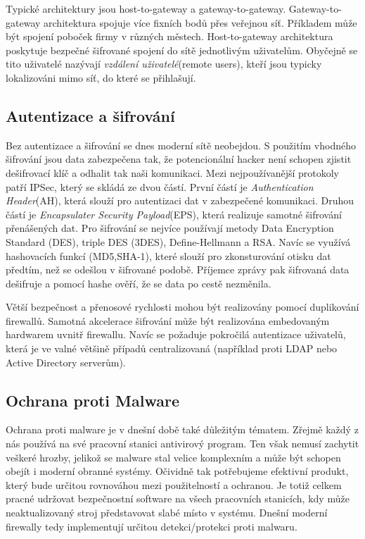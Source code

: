\documentclass[11pt,a4paper]{article}
\begin{document}
Typické architektury jsou host-to-gateway a gateway-to-gateway. Gateway-to-gateway architektura spojuje více fixních bodů přes veřejnou síť. Příkladem může být spojení poboček firmy v různých městech. Host-to-gateway architektura poskytuje bezpečné šifrované spojení do sítě jednotlivým uživatelům. Obyčejně se tito uživatelé nazývají \textit{vzdálení uživatelé}(remote users), kteří jsou typicky lokalizováni mimo síť, do které se přihlašují.

\subsection{Autentizace a šifrování}
Bez autentizace a šifrování se dnes moderní sítě neobejdou. S použitím vhodného šifrování jsou data zabezpečena tak, že potencionální hacker není schopen zjistit dešifrovací klíč a odhalit tak naši komunikaci. Mezi nejpoužívanější protokoly patří IPSec, který se skládá ze dvou částí. První částí je \textit{Authentication Header}(AH), která slouží pro autentizaci dat v zabezpečené komunikaci. Druhou částí je \textit{Encapsulater Security Payload}(EPS), která realizuje samotné šifrování přenášených dat. Pro šifrování se nejvíce používají metody Data Encryption Standard (DES), triple DES (3DES), Define-Hellmann a RSA. Navíc se využívá hashovacích funkcí (MD5,SHA-1), které slouží pro zkonsturování otisku dat předtím, než se odešlou v šifrované podobě. Příjemce zprávy pak šifrovaná data dešifruje a pomocí hashe ověří, že se data po cestě nezměnila.

Větší bezpečnost a přenosové rychlosti mohou být realizovány pomocí duplikování firewallů. Samotná akcelerace šifrování může být realizována embedovaným hardwarem uvnitř firewallu. Navíc se požaduje pokročilá autentizace uživatelů, která je ve valné většině případů centralizovaná (například proti LDAP nebo Active Directory serverům).

\subsection{Ochrana proti Malware}
Ochrana proti malware je v dnešní době také důležitým tématem. Zřejmě každý z nás používá na své pracovní stanici antivirový program. Ten však nemusí zachytit veškeré hrozby, jelikož se malware stal velice komplexním a může být schopen obejít i moderní obranné systémy. Očividně tak potřebujeme efektivní produkt, který bude určitou rovnováhou mezi použitelností a ochranou. Je totiž celkem pracné udržovat bezpečnostní software na všech pracovních stanicích, kdy může neaktualizovaný stroj představovat slabé místo v systému. Dnešní moderní firewally tedy implementují určitou detekci/protekci proti malwaru.
\end{document}
